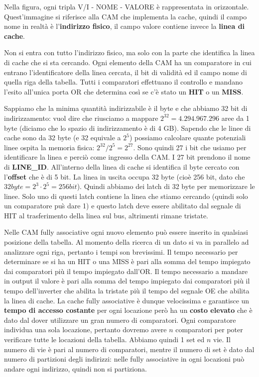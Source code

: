\documentclass[11pt]{book}
\begin{document}
Nella figura, ogni tripla V/I - NOME - VALORE \`e rappresentata in
orizzontale. Quest'immagine si riferisce alla CAM che implementa la
cache, quindi il campo nome in realt\`a \`e l'{\bf indirizzo fisico},
il campo valore contiene invece la {\bf linea di cache}. 

\par\bigskip

Non si entra con tutto l'indirizzo fisico, ma solo con la parte che
identifica la linea di cache che si sta cercando. Ogni elemento della
CAM ha un comparatore in cui entrano l'identificatore della linea
cercata, il bit di validit\`a ed il campo nome di quella riga della
tabella. Tutti i comparatori effettuano il controllo e mandano l'esito
all'unica porta OR che determina cos\`i se c'\`e stato un {\bf HIT} o
un {\bf MISS}.

\par\bigskip

Sappiamo che la minima quantit\`a indirizzabile \`e il byte e che
abbiamo 32 bit di indirizzamento: vuol dire che riusciamo a mappare
$2^{32} = 4.294.967.296$ aree da 1 byte (diciamo che lo spazio di
indirizzamento \`e di 4 GB). Sapendo che le linee di cache sono da 32
byte (e 32 equivale a $2^5$) possiamo calcolare quante potenziali
linee ospita la memoria fisica: $2^{32} / 2^5 = 2^{27}$. Sono quindi
27 i bit che usiamo per identificare la linea e perci\`o come ingresso
della CAM. I 27 bit prendono il nome di {\bf LINE\_ID}. All'interno
della linea di cache si identifica il byte cercato con l'{\bf offset}
che \`e di 5 bit. La linea in uscita occupa 32 byte (cio\`e 256 bit,
dato che $32 byte = 2^3 \cdot 2^5 = 256 bit$). Quindi abbiamo dei
latch di 32 byte per memorizzare le linee. Solo uno di questi latch
contiene la linea che stiamo cercando (quindi solo un comparatore
pu\`s dare 1) e questo latch deve essere abilitato dal segnale di HIT
al trasferimento della linea sul bus, altrimenti rimane tristate.

\par\bigskip

Nelle CAM fully associative ogni nuovo elemento pu\`o essere inserito
in qualsiasi posizione della tabella. Al momento della ricerca di un
dato si va in parallelo ad analizzare ogni riga, pertanto i tempi son
brevissimi. Il tempo necessario per determinare se si ha un HIT o una
MISS \`e pari alla somma del tempo impiegato dai comparatori pi\`u il
tempo impiegato dall'OR. Il tempo necessario a mandare in output il
valore \`e pari alla somma del tempo impiegato dai comparatori pi\`u
il tempo dell'inverter che abilita la tristate pi\`u il tempo del
segnale OE che abilita la linea di cache. La cache fully associative
\`e dunque velocissima e garantisce un {\bf tempo di accesso costante}
per ogni locazione per\`o ha un {\bf costo elevato} che \`e dato dal
dover utilizzare un gran numero di comparatori. Ogni comparatore
individua una sola locazione, pertanto dovremo avere $n$ comparatori
per poter verificare tutte le locazioni della tabella. Abbiamo quindi
1 set ed $n$ vie. Il numero di vie \`e pari al numero di comparatori,
mentre il numero di set \`e dato dal numero di partizioni degli
indirizzi: nelle fully associative in ogni locazioni pu\`o andare ogni
indirizzo, quindi non si partiziona.
\end{document}
